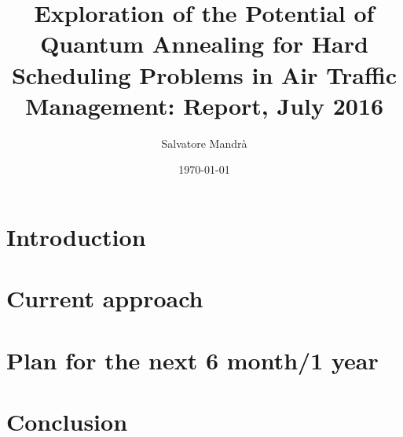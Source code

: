 \documentclass[prl,twocolumn,superscriptaddress,showpacs,floatfix,nofootinbib]{revtex4-1}
\begin{document}
\title{Exploration of the Potential of Quantum Annealing for Hard Scheduling Problems in Air Traffic Management: Report, July 2016}

\author{Salvatore Mandr{\`a}}

\date{\today}

\maketitle

\section{Introduction}

\Blindtext

\section{Current approach}

\Blindtext

\section{Plan for the next 6 month/1 year}

\Blindtext

\section{Conclusion}

\Blindtext


\end{document}
